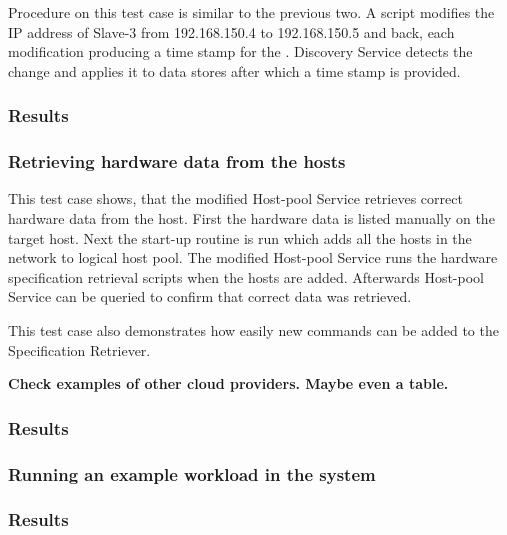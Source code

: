 Procedure on this test case is similar to the previous two. A script modifies the IP address of Slave-3 from 192.168.150.4 to 192.168.150.5 and back, each modification producing a time stamp for the . Discovery Service detects the change and applies it to data stores after which a time stamp is provided.

\subsubsection*{Results}

\subsubsection{Retrieving hardware data from the hosts}

This test case shows, that the modified Host-pool Service retrieves correct hardware data from the host. First the hardware data is listed manually on the target host. Next the start-up routine is run which adds all the hosts in the network to logical host pool. The modified Host-pool Service runs the hardware specification retrieval scripts when the hosts are added. Afterwards Host-pool Service can be queried to confirm that correct data was retrieved.

This test case also demonstrates how easily new commands can be added to the Specification Retriever.

\textbf{Check examples of other cloud providers. Maybe even a table.}

\subsubsection*{Results}

\subsubsection{Running an example workload in the system}

\subsubsection*{Results}